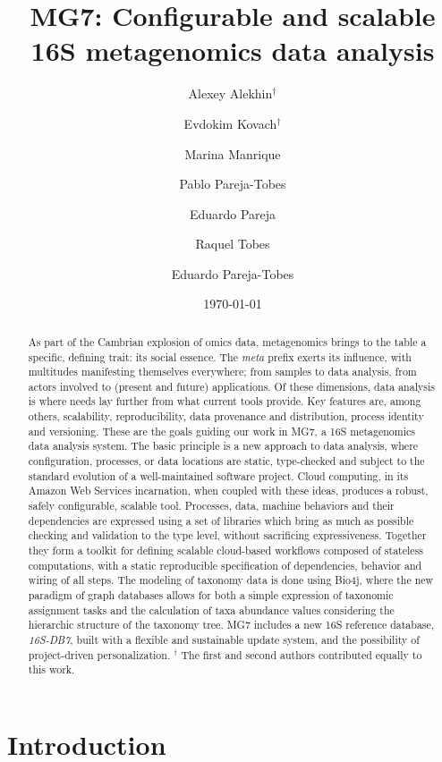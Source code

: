 \documentclass[fontsize=8pt,paper=a4,pagesize,abstracton]{scrartcl}
\title{\LARGE \bfseries MG7: Configurable and scalable 16S metagenomics data analysis}
\author[1]{\normalsize Alexey Alekhin\(^\dagger\)}
\author[1]{\normalsize Evdokim Kovach\(^\dagger\)}
\author[1]{\normalsize Marina Manrique}
\author[1]{\normalsize Pablo Pareja-Tobes}
\author[1]{\normalsize Eduardo Pareja}
\author[1]{\normalsize Raquel Tobes}
\author[1]{\normalsize Eduardo Pareja-Tobes}
\affil[1]{\small
  {\itshape\href{http://ohnosequences.com}{oh no sequences!}} research group, \href{http://www.era7bioinformatics.com}{Era7 bioinformatics}
}
\date{\normalsize \today}
\begin{document}
\maketitle

\begin{abstract} %
As part of the Cambrian explosion of omics data, metagenomics brings to
the table a specific, defining trait: its social essence. The
\emph{meta} prefix exerts its influence, with multitudes manifesting
themselves everywhere; from samples to data analysis, from actors
involved to (present and future) applications. Of these dimensions, data
analysis is where needs lay further from what current tools provide. Key
features are, among others, scalability, reproducibility, data
provenance and distribution, process identity and versioning. These are
the goals guiding our work in MG7, a 16S metagenomics data analysis
system. The basic principle is a new approach to data analysis, where
configuration, processes, or data locations are static, type-checked and
subject to the standard evolution of a well-maintained software project.
Cloud computing, in its Amazon Web Services incarnation, when coupled
with these ideas, produces a robust, safely configurable, scalable tool.
Processes, data, machine behaviors and their dependencies are expressed
using a set of libraries which bring as much as possible checking and
validation to the type level, without sacrificing expressiveness.
Together they form a toolkit for defining scalable cloud-based workflows
composed of stateless computations, with a static reproducible
specification of dependencies, behavior and wiring of all steps. The
modeling of taxonomy data is done using Bio4j, where the new paradigm of
graph databases allows for both a simple expression of taxonomic
assignment tasks and the calculation of taxa abundance values
considering the hierarchic structure of the taxonomy tree. MG7 includes
a new 16S reference database, \emph{16S-DB7}, built with a flexible and
sustainable update system, and the possibility of project-driven
personalization. \newline\newline
\(^\dagger\) The first and second authors contributed equally to this
work.
\end{abstract}

\thispagestyle{empty}

\tableofcontents

\newpage


\section{Introduction}\label{introduction}
\end{document}
